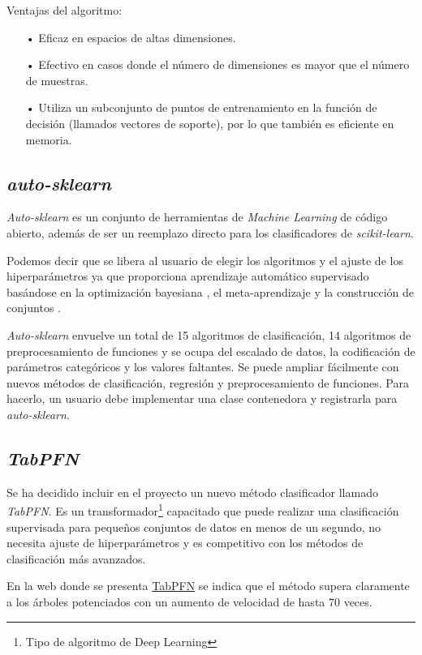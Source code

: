 Ventajas del algoritmo:
\begin{itemize}
	\item[•]Eficaz en espacios de altas dimensiones.
	\item[•]Efectivo en casos donde el número de dimensiones es mayor que el número de muestras.
	\item[•]Utiliza un subconjunto de puntos de entrenamiento en la función de decisión (llamados vectores de soporte), por lo que también es eficiente en memoria.
\end{itemize}

\subsection{\textit{auto-sklearn}}

\textit{Auto-sklearn} es un conjunto de herramientas de \textit{Machine Learning} de código abierto, además de ser un reemplazo directo para los clasificadores de \textit{scikit-learn}.\cite{auto-sklearn} 

Podemos decir que se libera al usuario de elegir los algoritmos y el ajuste de los hiperparámetros ya que proporciona aprendizaje automático supervisado basándose en la optimización bayesiana , el meta-aprendizaje y la construcción de conjuntos .

\textit{Auto-sklearn} envuelve un total de 15 algoritmos de clasificación, 14 algoritmos de preprocesamiento de funciones y se ocupa del escalado de datos, la codificación de parámetros categóricos y los valores faltantes. Se puede ampliar fácilmente con nuevos métodos de clasificación, regresión y preprocesamiento de funciones. Para hacerlo, un usuario debe implementar una clase contenedora y registrarla para \textit{auto-sklearn}.

\subsection{\textit{TabPFN}}

Se ha decidido incluir en el proyecto un nuevo método clasificador llamado \textit{TabPFN}. Es un transformador\footnote{Tipo de algoritmo de Deep Learning}\cite{Lopez2020Feb} capacitado que puede realizar una clasificación supervisada para pequeños conjuntos de datos en menos de un segundo, no necesita ajuste de hiperparámetros y es competitivo con los métodos de clasificación más avanzados.

En la web donde se presenta \href{https://www.automl.org/tabpfn-a-transformer-that-solves-small-tabular-classification-problems-in-a-second/}{TabPFN} se indica que el método supera claramente a los árboles potenciados con un aumento de velocidad de hasta 70 veces.

